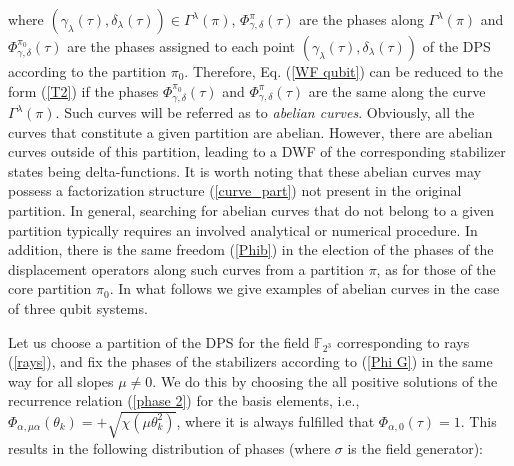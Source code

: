 \documentclass[quantumrep,article,submit,pdftex,moreauthors]{Definitions/mdpi}
\begin{document}
where $\left(\gamma_{\lambda}(\tau),\delta_{\lambda}(\tau)\right) \in
\Gamma^{\lambda}(\pi)$, $\Phi_{\gamma,\delta }^{\pi}(\tau)$ are the phases along
$\Gamma^{\lambda}(\pi)$ and $\Phi_{\gamma,\delta}^{\pi_{0}}(\tau)$ are the
phases assigned to each point
$\left(\gamma_{\lambda}(\tau),\delta_{\lambda}(\tau )\right)$ of the DPS
according to the partition $\pi_{0}$. Therefore, Eq. (\ref{WF qubit}) can
be reduced to the form (\ref{T2}) if the phases
$\Phi_{\gamma,\delta}^{\pi_{0}}(\tau)$ and $\Phi_{\gamma,\delta }^{\pi}(\tau)$
are the same along the curve $\Gamma^{\lambda}(\pi)$. Such curves will be
referred as to \textit{abelian curves}. Obviously, all the curves that
constitute a given partition are abelian. However, there are abelian curves
outside of this partition, leading to a DWF of the corresponding stabilizer
states being delta-functions.  It is worth noting that these abelian curves may
possess a factorization structure (\ref{curve_part}) not present in the original
partition. In general, searching for abelian curves that do not belong to a
given partition typically requires an involved analytical or numerical
procedure.  In addition, there is the same freedom (\ref{Phib}) in the election
of the phases of the displacement operators along such curves from a partition
$\pi$, as for those of the core partition $\pi_{0}$. In what follows we give
examples of abelian curves in the case of three qubit systems.

Let us choose a partition of the DPS for the field $\mathbb{F}_{2^{3}}$
corresponding to rays (\ref{rays}), and fix the phases of the stabilizers
according to (\ref{Phi G}) in the same way for all slopes $\mu \neq 0$. We do
this by choosing the all positive solutions of the recurrence relation
(\ref{phase 2}) for the basis elements, i.e.,
$\Phi_{\alpha,\mu\alpha}(\theta_{k}) =
+\sqrt{\chi\left(\mu\theta_{k}^{2}\right)}$, where it is always fulfilled that
$\Phi_{\alpha,0}(\tau) = 1$. This results in the following distribution of
phases (where $\sigma$ is the field generator): 
\end{document}
